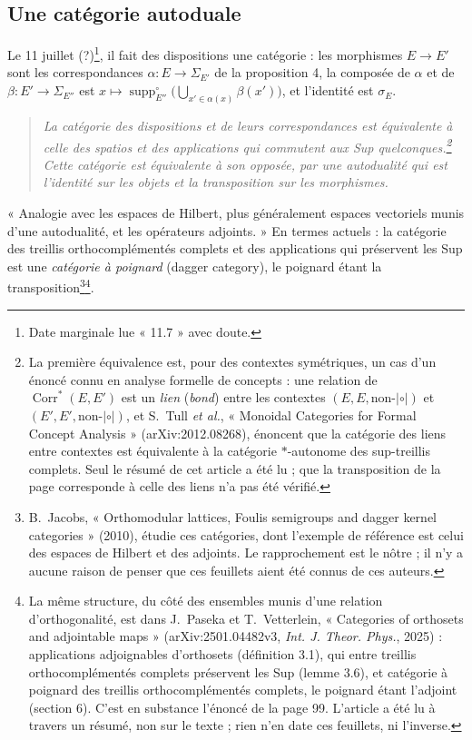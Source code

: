 \documentclass[11pt,a4paper]{article}
\begin{document}
\subsection*{Une catégorie autoduale}

Le 11 juillet (?)\footnote{Date marginale lue « 11.7 » avec doute.}, il fait des
dispositions une catégorie : les morphismes $E \to E'$ sont les correspondances
$\alpha : E \to \Sigma_{E'}$ de la proposition 4, la composée de $\alpha$ et de
$\beta : E' \to \Sigma_{E''}$ est $x \mapsto
\operatorname{supp}^{\circ}_{E''}\bigl(\bigcup_{x' \in \alpha(x)}\beta(x')\bigr)$,
et l'identité est $\sigma_{E}$.

\begin{quote}
\emph{La catégorie des dispositions et de leurs correspondances est équivalente à
celle des spatios et des applications qui commutent aux Sup quelconques.\footnote{La première équivalence est, pour des contextes symétriques, un cas
d'un énoncé connu en analyse formelle de concepts : une relation de
$\operatorname{Corr}^{*}(E, E')$ est un \emph{lien} (\emph{bond}) entre les
contextes $(E, E, \text{non-}{\mathrel{|\circ|}})$ et $(E', E',
\text{non-}{\mathrel{|\circ|}})$, et S.~Tull \emph{et al.}, « Monoidal
Categories for Formal Concept Analysis » (arXiv:2012.08268), énoncent que la
catégorie des liens entre contextes est équivalente à la catégorie
$*$-autonome des sup-treillis complets. Seul le résumé de cet article a été
lu ; que la transposition de la page corresponde à celle des liens n'a pas
été vérifié.} Cette
catégorie est équivalente à son opposée, par une autodualité qui est l'identité
sur les objets et la transposition sur les morphismes.}
\end{quote}

« Analogie avec les espaces de Hilbert, plus généralement espaces vectoriels munis
d'une autodualité, et les opérateurs adjoints. » En termes actuels : la catégorie
des treillis orthocomplémentés complets et des applications qui préservent les
Sup est une \emph{catégorie à poignard} (dagger category), le poignard étant la
transposition\footnote{B.~Jacobs, « Orthomodular lattices, Foulis semigroups and
dagger kernel categories » (2010), étudie ces catégories, dont
l'exemple de référence est celui des espaces de Hilbert et des adjoints. Le
rapprochement est le nôtre ; il n'y a aucune raison de penser que ces feuillets
aient été connus de ces auteurs.}\footnote{La même structure, du côté des ensembles munis d'une relation
d'orthogonalité, est dans J.~Paseka et T.~Vetterlein, « Categories of orthosets
and adjointable maps » (arXiv:2501.04482v3, \emph{Int. J. Theor. Phys.}, 2025) :
applications adjoignables d'orthosets (définition 3.1), qui entre treillis
orthocomplémentés complets préservent les Sup (lemme 3.6), et catégorie à
poignard des treillis orthocomplémentés complets, le poignard étant l'adjoint
(section 6). C'est en substance l'énoncé de la page 99. L'article a été lu à
travers un résumé, non sur le texte ; rien n'en date ces feuillets, ni
l'inverse.}.
\end{document}
